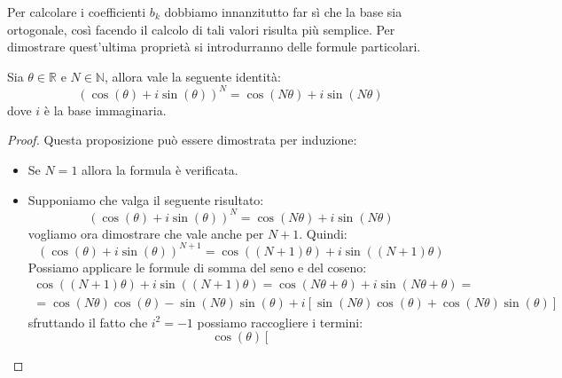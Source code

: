 Per calcolare i coefficienti $b_k$ dobbiamo innanzitutto far sì che la base sia
ortogonale, così facendo il calcolo di tali valori risulta più semplice. Per dimostrare 
quest'ultima proprietà si introdurranno delle formule particolari.

\begin{proposizione}
    Sia $\theta\in \mathbb{R}$ e $N\in \mathbb{N}$, allora vale la seguente identità:
    \begin{equation}
        (\cos (\theta) + i\sin (\theta))^N = \cos(N \theta) + i \sin(N\theta)
    \end{equation}
    dove $i$ è la base immaginaria.
    \begin{proof}
        Questa proposizione può essere dimostrata per induzione:
        \begin{itemize}
            \item Se $N = 1$ allora la formula è verificata.
            \item Supponiamo che valga il seguente risultato:
                  \begin{equation*}
                      (\cos (\theta) + i\sin (\theta))^N = \cos(N \theta) + i \sin(N\theta)
                  \end{equation*}
                  vogliamo ora dimostrare che vale anche per $N+1$. Quindi:
                  \begin{equation*}
                      (\cos (\theta) + i\sin (\theta))^{N+1}= \cos((N+1) \theta) + i \sin((N+1)\theta)
                  \end{equation*}
                  Possiamo applicare le formule di somma del seno e del coseno:
                  \begin{equation*}
                      \begin{array}{l}
                          \cos((N + 1) \theta) + i \sin((N + 1)\theta) = \cos(N\theta
                          + \theta) + i \sin(N\theta + \theta) = \\
                          = \cos(N\theta)\cos(\theta) -\sin(N\theta)\sin(\theta) + i
                          \left[\sin(N\theta)\cos(\theta)+\cos(N\theta)\sin(\theta)\right]
                      \end{array}
                  \end{equation*}
                  sfruttando il fatto che $i^2 = -1$ possiamo raccogliere i termini:
                  \begin{equation*}
                      \cos(\theta) \left[

\end{equation*}
\end{itemize}
\end{proof}
\end{proposizione}
